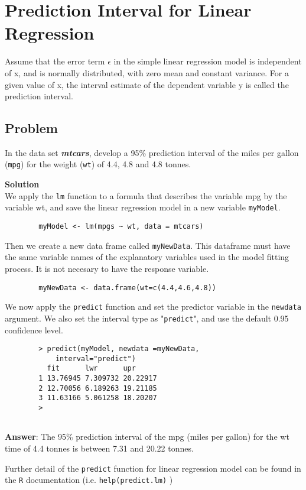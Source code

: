 \documentclass[a4paper,12pt]{article}
\begin{document}
	
	\Large
	\section{Prediction Interval for Linear Regression}
	
	
	
	Assume that the error term $\epsilon$ in the simple linear regression model is independent of x, and is normally distributed, with zero mean and constant variance. For a given value of x, the interval estimate of the dependent variable y is called the prediction interval.
	
	\subsection{Problem}
	In the data set \textbf{\textit{mtcars}}, develop a 95\% prediction interval of the miles per gallon (\texttt{mpg})  for the weight (\texttt{wt}) of 4.4, 4.8 and 4.8 tonnes.\\
	\bigskip
	
	\noindent \textbf{Solution}\\
	We apply the \texttt{lm} function to a formula that describes the variable mpg by the variable wt, and save the linear regression model in a new variable \texttt{myModel}.
	
	\begin{framed}
		\begin{verbatim}
		myModel <- lm(mpgs ~ wt, data = mtcars)
		\end{verbatim}
	\end{framed}
	\noindent Then we create a new data frame called \texttt{myNewData}. This dataframe must have the same variable names of the explanatory variables used in the model fitting process. It is not necesary to have the response variable.
	\begin{framed}
		\begin{verbatim}
		myNewData <- data.frame(wt=c(4.4,4.6,4.8))
		\end{verbatim}
	\end{framed}
	\noindent We now apply the \texttt{predict} function and set the predictor variable in the \texttt{newdata} argument. We also set the interval type as "\texttt{predict}", and use the default 0.95 confidence level.
	
	\begin{framed}
		\begin{verbatim}
		> predict(myModel, newdata =myNewData, 
		    interval="predict") 
		  fit      lwr      upr
		1 13.76945 7.309732 20.22917
		2 12.70056 6.189263 19.21185
		3 11.63166 5.061258 18.20207
		> 
		
		\end{verbatim}
	\end{framed}
	\noindent \textbf{Answer}: The 95\% prediction interval of the mpg (miles per gallon) for the wt time of 4.4 tonnes is between 7.31 and 20.22 tonnes.\\ 
	\bigskip
	
	\noindent Further detail of the \texttt{predict} function for linear regression model can be found in the \texttt{R} documentation (i.e. \texttt{help(predict.lm)} )
\end{document}
